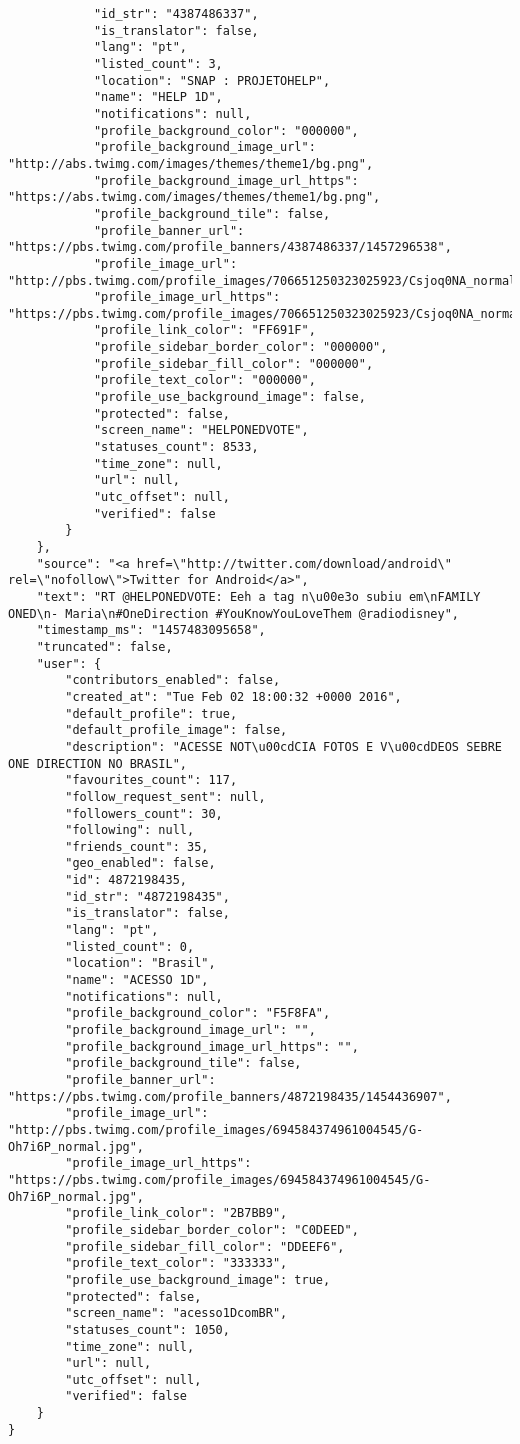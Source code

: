\begin{lstlisting}
            "id_str": "4387486337",
            "is_translator": false,
            "lang": "pt",
            "listed_count": 3,
            "location": "SNAP : PROJETOHELP",
            "name": "HELP 1D",
            "notifications": null,
            "profile_background_color": "000000",
            "profile_background_image_url": "http://abs.twimg.com/images/themes/theme1/bg.png",
            "profile_background_image_url_https": "https://abs.twimg.com/images/themes/theme1/bg.png",
            "profile_background_tile": false,
            "profile_banner_url": "https://pbs.twimg.com/profile_banners/4387486337/1457296538",
            "profile_image_url": "http://pbs.twimg.com/profile_images/706651250323025923/Csjoq0NA_normal.jpg",
            "profile_image_url_https": "https://pbs.twimg.com/profile_images/706651250323025923/Csjoq0NA_normal.jpg",
            "profile_link_color": "FF691F",
            "profile_sidebar_border_color": "000000",
            "profile_sidebar_fill_color": "000000",
            "profile_text_color": "000000",
            "profile_use_background_image": false,
            "protected": false,
            "screen_name": "HELPONEDVOTE",
            "statuses_count": 8533,
            "time_zone": null,
            "url": null,
            "utc_offset": null,
            "verified": false
        }
    },
    "source": "<a href=\"http://twitter.com/download/android\" rel=\"nofollow\">Twitter for Android</a>",
    "text": "RT @HELPONEDVOTE: Eeh a tag n\u00e3o subiu em\nFAMILY ONED\n- Maria\n#OneDirection #YouKnowYouLoveThem @radiodisney",
    "timestamp_ms": "1457483095658",
    "truncated": false,
    "user": {
        "contributors_enabled": false,
        "created_at": "Tue Feb 02 18:00:32 +0000 2016",
        "default_profile": true,
        "default_profile_image": false,
        "description": "ACESSE NOT\u00cdCIA FOTOS E V\u00cdDEOS SEBRE ONE DIRECTION NO BRASIL",
        "favourites_count": 117,
        "follow_request_sent": null,
        "followers_count": 30,
        "following": null,
        "friends_count": 35,
        "geo_enabled": false,
        "id": 4872198435,
        "id_str": "4872198435",
        "is_translator": false,
        "lang": "pt",
        "listed_count": 0,
        "location": "Brasil",
        "name": "ACESSO 1D",
        "notifications": null,
        "profile_background_color": "F5F8FA",
        "profile_background_image_url": "",
        "profile_background_image_url_https": "",
        "profile_background_tile": false,
        "profile_banner_url": "https://pbs.twimg.com/profile_banners/4872198435/1454436907",
        "profile_image_url": "http://pbs.twimg.com/profile_images/694584374961004545/G-Oh7i6P_normal.jpg",
        "profile_image_url_https": "https://pbs.twimg.com/profile_images/694584374961004545/G-Oh7i6P_normal.jpg",
        "profile_link_color": "2B7BB9",
        "profile_sidebar_border_color": "C0DEED",
        "profile_sidebar_fill_color": "DDEEF6",
        "profile_text_color": "333333",
        "profile_use_background_image": true,
        "protected": false,
        "screen_name": "acesso1DcomBR",
        "statuses_count": 1050,
        "time_zone": null,
        "url": null,
        "utc_offset": null,
        "verified": false
    }
}


\end{lstlisting}